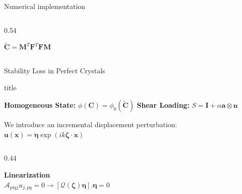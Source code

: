 \documentclass[10pt, aspectratio=169]{beamer}
\begin{document}
\begin{frame}{Numerical implementation}
\begin{columns}[c, onlytextwidth]
\begin{column}{0.54\textwidth}
\begin{flushleft}
                \vspace{0.3cm}
                \centering
                {\large $\tilde{\mathbf{C}} = \mathbf{M}^T \mathbf{F}^T \mathbf{F} \mathbf{M}$}
            \end{flushleft}
        \end{column}
    \end{columns}
\end{frame}


\begin{frame}{Stability Loss in Perfect Crystals}
    \vspace{0.4cm}
    \centering
    
    \begin{beamercolorbox}[wd=0.92\textwidth, rounded=true, center]{title}
        \centering \rule{0pt}{0.6cm}
        {\textbf{Homogeneous State:} \quad $\phi(\mathbf{C}) = \phi_0(\tilde{\mathbf{C}})$} \qquad 
        \vline \qquad
        {\textbf{Shear Loading:} \quad $S = \mathbf{I} + \alpha \mathbf{a} \otimes \mathbf{n}$}
        \rule[-0.5cm]{0pt}{0.6cm}
    \end{beamercolorbox}

    \vspace{0.7cm}
    {\small \color{gray} We introduce an incremental displacement perturbation:} \\
    \vspace{0.2cm}
    {\Large $\mathbf{u}(\mathbf{x}) = \boldsymbol{\eta} \exp(i k \boldsymbol{\zeta} \cdot \mathbf{x})$}

    \vspace{0.8cm}
    \begin{columns}[c, onlytextwidth]
        \begin{column}{0.44\textwidth}
            \centering
            \colorbox{AcademicNavy!5}{
                \begin{minipage}{0.95\linewidth}
                    \centering \rule{0pt}{0.35cm}
                    \textbf{\color{red!80!black} Linearization} \\
                    \vspace{0.2cm}
                    $\mathcal{A}_{piqj} u_{j,pq} = 0 \rightarrow [\mathcal{Q}(\boldsymbol{\zeta})\boldsymbol{\eta}].\boldsymbol{\eta}=0$
                    \rule[-0.3cm]{0pt}{0.35cm}
                \end{minipage}
            }
        \end{column}
        

\end{columns}
\end{frame}
\end{document}
